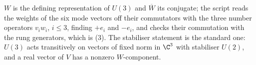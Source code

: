 $W$ is the defining representation of $U(3)$ and $\overline{W}$ its conjugate; the script reads the weights of the six mode vectors off their commutators with the three number operators $v_{i}w_{i}$, $i \le 3$, finding $+e_{i}$ and $-e_{i}$, and checks their commutation with the rung generators, which is (3). The stabiliser statement is the standard one: $U(3)$ acts transitively on vectors of fixed norm in $\C^{3}$ with stabiliser $U(2)$, and a real vector of $V$ has a nonzero $W$-component.
